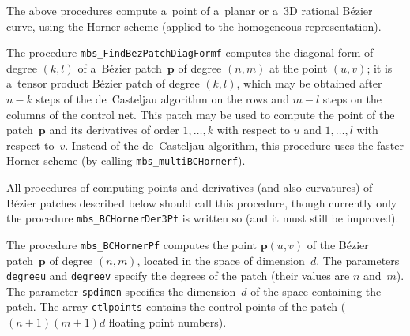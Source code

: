 \vspace{\bigskipamount}
The above procedures compute a~point of a~planar or a~$3$D rational
B\'{e}zier curve, using the Horner scheme (applied to the homogeneous
representation).

\vspace{\bigskipamount}
The procedure \texttt{mbs\_FindBezPatchDiagFormf} computes the diagonal
form of degree $(k,l)$ of a~B\'{e}zier patch~$\bm{p}$ of degree $(n,m)$
at the point $(u,v)$; it is a~tensor product B\'{e}zier patch of degree
$(k,l)$, which may be obtained after $n-k$ steps of the de~Casteljau algorithm
on the rows and $m-l$ steps on the columns of the control net.
This patch may be used to compute the point of the patch~$\bm{p}$
and its derivatives of order $1,\ldots,k$ with respect to $u$
and $1,\ldots,l$ with respect to~$v$. Instead of the de~Casteljau algorithm,
this procedure uses the faster Horner scheme
(by calling \texttt{mbs\_multiBCHornerf}).

All procedures of computing points and derivatives (and also curvatures)
of B\'{e}zier patches described below should call this procedure, though
currently only the procedure \texttt{mbs\_BCHornerDer3Pf} is written so
(and it must still be improved).

\vspace{\bigskipamount}
\begin{sloppypar}
The procedure \texttt{mbs\_BCHornerPf} computes the point $\bm{p}(u,v)$ of the
B\'{e}zier patch~$\bm{p}$ of degree $(n,m)$, located in the space of dimension~$d$.
The parameters \texttt{degreeu} and \texttt{degreev} specify the degrees of
the patch (their values are $n$ and~$m$). The parameter
\texttt{spdimen} specifies the dimension~$d$ of the space containing the patch.
The array \texttt{ctlpoints} contains the control points of the patch
($(n+1)(m+1)d$ floating point numbers).%
\end{sloppypar}

